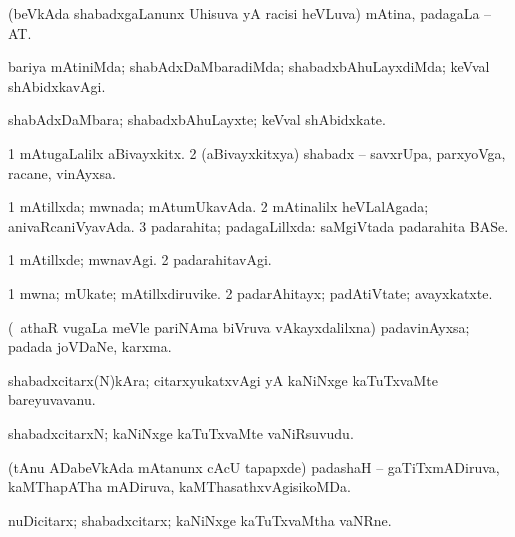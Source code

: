 {{{{{{{\bentry
{} 
\gl{\nA}
\expl{}
\bmng
(beVkAda shabadxgaLanunx Uhisuva yA racisi heVLuva) mAtina, padagaLa -- AT. 
\emng
\eentry

\bentry
{} 
\gl{\kirxvi}
\expl{}
\bmng
bariya mAtiniMda; shabAdxDaMbaradiMda; shabadxbAhuLayxdiMda; keVval shAbidxkavAgi. 
\emng
\eentry

\bentry
{} 
\gl{\nA}
\expl{}
\bmng
shabAdxDaMbara; shabadxbAhuLayxte; keVval shAbidxkate. 
\emng
\eentry

\bentry
{} 
\gl{\nA}
\expl{}
\bmng
\bnum
\num{1} mAtugaLalilx aBivayxkitx. 
\num{2} (aBivayxkitxya) shabadx -- savxrUpa, parxyoVga, racane, vinAyxsa. 
\enum
\emng
\eentry

\bentry
{} 
\gl{\gu}
\expl{}
\bmng
\bnum
\num{1} mAtillxda; mwnada; mAtumUkavAda. 
\num{2} mAtinalilx heVLalAgada; anivaRcaniVyavAda. 
\num{3} padarahita; padagaLillxda:  saMgiVtada padarahita BASe. 
\enum
\emng
\eentry

\bentry
{} 
\gl{\kirxvi}
\expl{}
\bmng
\bnum
\num{1} mAtillxde; mwnavAgi. 
\num{2} padarahitavAgi. 
\enum
\emng
\eentry

\bentry
{} 
\gl{\nA}
\expl{}
\bmng
\bnum
\num{1} mwna; mUkate; mAtillxdiruvike. 
\num{2} padarAhitayx; padAtiVtate; avayxkatxte. 
\enum
\emng
\eentry

\bentry
{} 
\gl{\nA}
\expl{}
\bmng
(\kanmu\ athaR \mo vugaLa meVle pariNAma biVruva vAkayxdalilxna) padavinAyxsa; padada joVDaNe, karxma. 
\emng
\eentry

\bentry
{} 
\gl{\nA}
\expl{}
\bmng
shabadxcitarx(N)kAra; citarxyukatxvAgi yA kaNiNxge kaTuTxvaMte bareyuvavanu. 
\emng
\eentry

\bentry
{} 
\gl{\nA}
\expl{}
\bmng
shabadxcitarxN; kaNiNxge kaTuTxvaMte vaNiRsuvudu. 
\emng
\eentry

\bentry
{} 
\gl{\gu}
\expl{}
\bmng
(tAnu ADabeVkAda mAtanunx cAcU tapapxde) padashaH -- gaTiTxmADiruva, kaMThapATha mADiruva, kaMThasathxvAgisikoMDa. 
\emng
\eentry

\bentry
{} 
\gl{\nA}
\expl{}
\bmng
nuDicitarx; shabadxcitarx; kaNiNxge kaTuTxvaMtha vaNRne. 
\emng
\eentry

}}}}}}}
